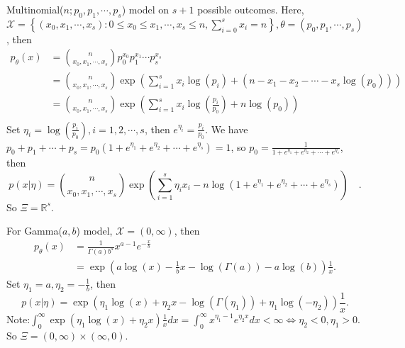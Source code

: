 \documentclass[a4paper]{article}
\begin{document}
\begin{eg}
	Multinomial($n; p_0, p_1, \cdots, p_s$) model on $s+1$ possible outcomes. Here, $\mathcal{X} = \left\{(x_0, x_1, \cdots, x_s): 0 \leq x_0 \leq x_1, \cdots, x_s \leq n, \sum\limits_{i = 0}^s x_i = n\right\}, \theta = (p_0, p_1, \cdots, p_s)$, then
	\begin{equation}
		\begin{aligned}
			p_{\theta} (x) &= \binom{n}{x_0, x_1, \cdots, x_s} p_0^{x_0} p_1^{x_1} \cdots p_s^{x_s} \\
			&= \binom{n}{x_0, x_1, \cdots, x_s} \exp\left(\sum\limits_{i = 1}^s x_i \log(p_i) + (n - x_1 - x_2 - \cdots - x_s \log(p_0))\right) \\
			&= \binom{n}{x_0, x_1, \cdots, x_s} \exp\left(\sum\limits_{i = 1}^s x_i \log\left(\frac{p_i}{p_0}\right) + n\log(p_0)\right) \\
		\end{aligned}
	\end{equation}
	Set $\eta_i = \log\left(\frac{p_i}{p_0}\right), i = 1, 2, \cdots, s$, then $e^{\eta_i} = \frac{p_i}{p_0}$.
	We have $p_0 + p_1 + \cdots + p_s = p_0(1+e^{\eta_1}+e^{\eta_2}+\cdots+e^{\eta_s}) = 1$, so $p_0 = \frac{1}{1+e^{\eta_1}+e^{\eta_2}+\cdots+e^{\eta_s}}$, then
	\begin{equation}
		p(x|\eta) = \binom{n}{x_0, x_1, \cdots, x_s} \exp\left(\sum\limits_{i = 1}^s \eta_i x_i - n\log(1+e^{\eta_1}+e^{\eta_2}+\cdots+e^{\eta_s})\right)\quad.
	\end{equation}
	So $\Xi = \mathbb{R}^s$.
\end{eg}

\begin{eg}
	For Gamma($a,b$) model, $\mathcal{X} = (0, \infty)$, then
	\begin{equation}
		\begin{aligned}
			p_\theta(x) &= \frac{1}{\Gamma (a) b^a} x^{a-1}e^{-\frac{x}{b}}\\
			&=\exp \left(a \log (x) - \frac{1}{b} x -\log(\Gamma (a))- a \log (b)\right) \frac{1}{x}.
		\end{aligned}
	\end{equation}
	Set $\eta_1 = a, \eta_2 = -\frac{1}{b}$, then
	\begin{equation}
		p(x|\eta) = \exp(\eta_1\log(x)+\eta_2x-\log(\Gamma(\eta_1))+\eta_1\log(-\eta_2))\frac{1}{x}.
	\end{equation}
	Note:$\int_{0}^{\infty} \exp (\eta_1\log(x) + \eta_2x) \frac{1}{x}dx = \int_{0}^{\infty} x^{\eta_1 -1} e^{\eta_2x}dx < \infty \iff \eta_2<0, \eta_1 > 0$.
	So $\Xi = (0, \infty) \times (\infty,0).$
\end{eg}
\end{document}
